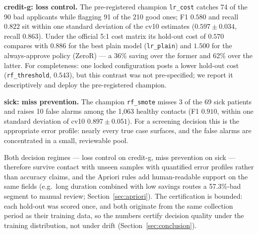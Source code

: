 \textbf{credit-g: loss control.} The pre-registered champion \texttt{lr\_cost} catches 74 of the 90 bad applicants while flagging 91 of the 210 good ones; F1 $0.580$ and recall $0.822$ sit within one standard deviation of the cv10 estimates ($0.597\pm0.034$, recall $0.863$). Under the official 5:1 cost matrix its hold-out cost of $0.570$ compares with $0.886$ for the best plain model (\texttt{lr\_plain}) and $1.500$ for the always-approve policy (ZeroR) --- a 36\% saving over the former and 62\% over the latter. For completeness: one locked configuration posts a lower hold-out cost (\texttt{rf\_threshold}, $0.543$), but this contrast was not pre-specified; we report it descriptively and deploy the pre-registered champion.

\textbf{sick: miss prevention.} The champion \texttt{rf\_smote} misses 3 of the 69 sick patients and raises 10 false alarms among the 1{,}063 healthy contacts (F1 $0.910$, within one standard deviation of cv10 $0.897\pm0.051$). For a screening decision this is the appropriate error profile: nearly every true case surfaces, and the false alarms are concentrated in a small, reviewable pool.

Both decision regimes --- loss control on credit-g, miss prevention on sick --- therefore survive contact with unseen samples with quantified error profiles rather than accuracy claims, and the Apriori rules add human-readable support on the same fields (e.g.\ long duration combined with low savings routes a 57.3\%-bad segment to manual review; Section~\ref{sec:apriori}). The certification is bounded: each hold-out was scored once, and both originate from the same collection period as their training data, so the numbers certify decision quality under the training distribution, not under drift (Section~\ref{sec:conclusion}).
